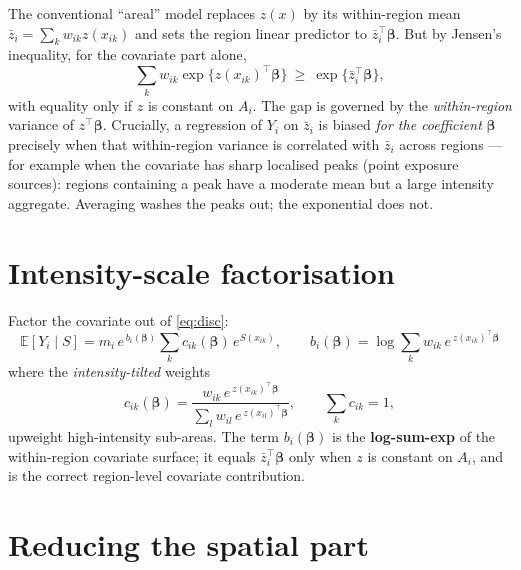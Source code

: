\documentclass[11pt]{article}
\newcommand{\bet}{\bm{\beta}}
\newcommand{\Ai}{A_i}
\newcommand{\E}{\mathbb{E}}
\begin{document}
The conventional ``areal'' model replaces $z(x)$ by its within-region mean
$\bar z_i=\sum_k w_{ik}z(x_{ik})$ and sets the region linear predictor to
$\bar z_i^\top\bet$. But by Jensen's inequality, for the covariate part alone,
\begin{equation}
\sum_k w_{ik}\exp\{z(x_{ik})^\top\bet\}
\ \ge\ \exp\{\bar z_i^\top\bet\},
\end{equation}
with equality only if $z$ is constant on $\Ai$. The gap is governed by the
\emph{within-region} variance of $z^\top\bet$. Crucially, a regression of $Y_i$ on
$\bar z_i$ is biased \emph{for the coefficient} $\bet$ precisely when that
within-region variance is correlated with $\bar z_i$ across regions --- for example
when the covariate has sharp localised peaks (point exposure sources): regions
containing a peak have a moderate mean but a large intensity aggregate. Averaging
washes the peaks out; the exponential does not.

\section{Intensity-scale factorisation}

Factor the covariate out of \eqref{eq:disc}:
\begin{equation}
\boxed{\;
\E[Y_i\mid S]= m_i\,e^{\,b_i(\bet)}\sum_k c_{ik}(\bet)\,e^{S(x_{ik})},
\qquad
b_i(\bet)=\log\!\sum_k w_{ik}\,e^{\,z(x_{ik})^\top\bet}\;}
\label{eq:factor}
\end{equation}
where the \emph{intensity-tilted} weights
\begin{equation}
c_{ik}(\bet)=\frac{w_{ik}\,e^{\,z(x_{ik})^\top\bet}}{\sum_l w_{il}\,e^{\,z(x_{il})^\top\bet}},
\qquad \sum_k c_{ik}=1,
\label{eq:tilt}
\end{equation}
upweight high-intensity sub-areas. The term $b_i(\bet)$ is the \textbf{log-sum-exp}
of the within-region covariate surface; it equals $\bar z_i^\top\bet$ only when $z$
is constant on $\Ai$, and is the correct region-level covariate contribution.

\section{Reducing the spatial part}
\end{document}
